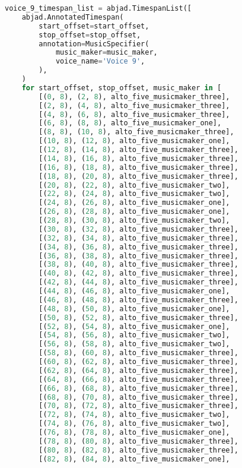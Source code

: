 \begin{lstlisting}[language=Python, caption=Invocation Source Code]
voice_9_timespan_list = abjad.TimespanList([
    abjad.AnnotatedTimespan(
        start_offset=start_offset,
        stop_offset=stop_offset,
        annotation=MusicSpecifier(
            music_maker=music_maker,
            voice_name='Voice 9',
        ),
    )
    for start_offset, stop_offset, music_maker in [
        [(0, 8), (2, 8), alto_five_musicmaker_three],
        [(2, 8), (4, 8), alto_five_musicmaker_three],
        [(4, 8), (6, 8), alto_five_musicmaker_three],
        [(6, 8), (8, 8), alto_five_musicmaker_one],
        [(8, 8), (10, 8), alto_five_musicmaker_three],
        [(10, 8), (12, 8), alto_five_musicmaker_one],
        [(12, 8), (14, 8), alto_five_musicmaker_three],
        [(14, 8), (16, 8), alto_five_musicmaker_three],
        [(16, 8), (18, 8), alto_five_musicmaker_three],
        [(18, 8), (20, 8), alto_five_musicmaker_three],
        [(20, 8), (22, 8), alto_five_musicmaker_two],
        [(22, 8), (24, 8), alto_five_musicmaker_two],
        [(24, 8), (26, 8), alto_five_musicmaker_one],
        [(26, 8), (28, 8), alto_five_musicmaker_one],
        [(28, 8), (30, 8), alto_five_musicmaker_two],
        [(30, 8), (32, 8), alto_five_musicmaker_three],
        [(32, 8), (34, 8), alto_five_musicmaker_three],
        [(34, 8), (36, 8), alto_five_musicmaker_three],
        [(36, 8), (38, 8), alto_five_musicmaker_three],
        [(38, 8), (40, 8), alto_five_musicmaker_three],
        [(40, 8), (42, 8), alto_five_musicmaker_three],
        [(42, 8), (44, 8), alto_five_musicmaker_three],
        [(44, 8), (46, 8), alto_five_musicmaker_one],
        [(46, 8), (48, 8), alto_five_musicmaker_three],
        [(48, 8), (50, 8), alto_five_musicmaker_one],
        [(50, 8), (52, 8), alto_five_musicmaker_three],
        [(52, 8), (54, 8), alto_five_musicmaker_one],
        [(54, 8), (56, 8), alto_five_musicmaker_two],
        [(56, 8), (58, 8), alto_five_musicmaker_two],
        [(58, 8), (60, 8), alto_five_musicmaker_three],
        [(60, 8), (62, 8), alto_five_musicmaker_three],
        [(62, 8), (64, 8), alto_five_musicmaker_three],
        [(64, 8), (66, 8), alto_five_musicmaker_three],
        [(66, 8), (68, 8), alto_five_musicmaker_three],
        [(68, 8), (70, 8), alto_five_musicmaker_three],
        [(70, 8), (72, 8), alto_five_musicmaker_three],
        [(72, 8), (74, 8), alto_five_musicmaker_two],
        [(74, 8), (76, 8), alto_five_musicmaker_two],
        [(76, 8), (78, 8), alto_five_musicmaker_one],
        [(78, 8), (80, 8), alto_five_musicmaker_three],
        [(80, 8), (82, 8), alto_five_musicmaker_three],
        [(82, 8), (84, 8), alto_five_musicmaker_one],

\end{lstlisting}
